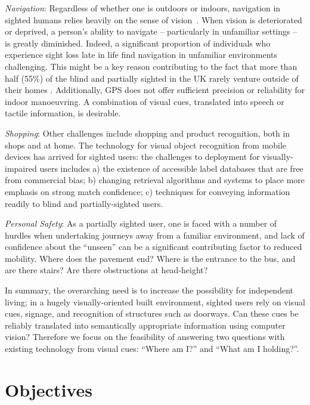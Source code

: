 \emph{Navigation}: Regardless of whether one is outdoors or indoors, navigation in sighted humans relies heavily on the sense of vision~\citep{kalia2008learning,tsuji2005landmarks}. When vision is deteriorated or deprived, a person's ability to navigate -- particularly in unfamiliar settings -- is greatly diminished. Indeed, a significant proportion of individuals who experience sight loss late in life find navigation in unfamiliar environments challenging. This might be a key reason contributing to the fact that more than half (55\%) of the blind and partially sighted in the UK rarely venture outside of their homes \citep{Worsfold2010}. Additionally, GPS does not offer sufficient precision or reliability for indoor manoeuvring. A combination of visual cues, translated into speech or tactile information, is desirable.

\emph{Shopping}: Other challenges include shopping and product recognition, both in shops and at home. The technology for visual object recognition from mobile devices has arrived for sighted users: the challenges to deployment for visually-impaired users includes a) the existence of accessible label databases that are free from commercial bias; b) changing retrieval algorithms and systems to place more emphasis on strong match confidence; c) techniques for conveying information readily to blind and partially-sighted users.

\emph{Personal Safety}: As a partially sighted user, one is faced with a number of hurdles when undertaking journeys away from a familiar environment, and lack of confidence about the ``unseen'' can be a significant contributing factor to reduced mobility.  Where does the pavement end?  Where is the entrance to the bus, and are there stairs?  Are there obstructions at head-height?   

In summary, the overarching need is to increase the possibility for independent living; in a hugely visually-oriented built environment, sighted users rely on visual cues, signage, and recognition of structures such as doorways.  Can these cues be reliably translated into semantically appropriate information using computer vision? Therefore we focus on the feasibility of answering two questions with existing technology from visual cues: ``Where am I?'' and ``What am I holding?''. 

\section{Objectives}

